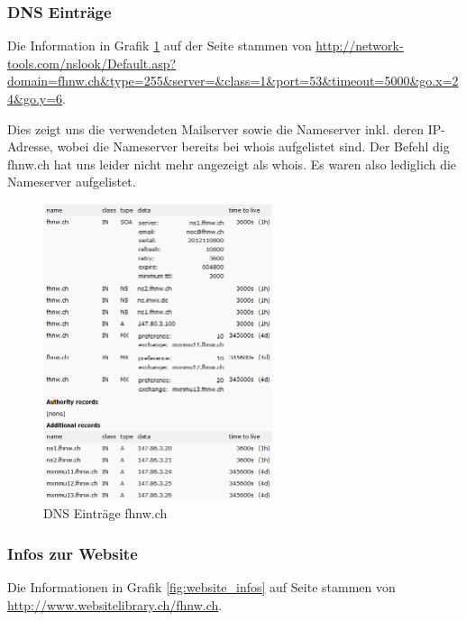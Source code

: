 \documentclass[a4paper,11pt]{scrartcl}
\begin{document}
\subsubsection{DNS Einträge}
Die Information in Grafik \ref{fig:dns_records} auf der Seite \pageref{fig:dns_records} stammen von \url{http://network-tools.com/nslook/Default.asp?domain=fhnw.ch&type=255&server=&class=1&port=53&timeout=5000&go.x=24&go.y=6}.

Dies zeigt uns die verwendeten Mailserver sowie die Nameserver inkl. deren IP-Adresse, wobei die Nameserver bereits bei whois aufgelistet sind. Der Befehl \glqq{}dig fhnw.ch\grqq{} hat uns leider nicht mehr angezeigt als whois. Es waren also lediglich die Nameserver aufgelistet.
\begin{figure}[p]
	\centering
	\includegraphics[width=0.6\textwidth]{../aufg5/dns_records.png}
	\caption{DNS Einträge fhnw.ch}
	\label{fig:dns_records}
\end{figure}

\subsubsection{Infos zur Website}
Die Informationen in Grafik \ref{fig:website_infos} auf Seite \pageref{fig:website_infos} stammen von \url{http://www.websitelibrary.ch/fhnw.ch}.
\end{document}
